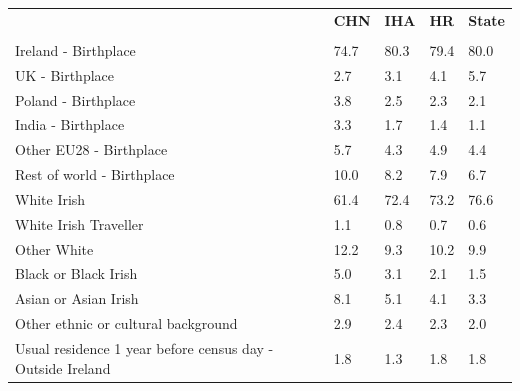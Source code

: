 \documentclass{article}
\begin{document}
\pagebreak
\begin{table}[h]	
\centering
		\begin{tabular}{KTTTT}
  \hline
& \textbf{CHN} & \textbf{IHA} & \textbf{HR}& \textbf{State}\\ 
  \hline
    \\ 
    \hline
Ireland - Birthplace & 74.7& 80.3& 79.4& 80.0\\
UK - Birthplace & 2.7& 3.1& 4.1& 5.7\\
Poland - Birthplace & 3.8& 2.5& 2.3& 2.1\\
India - Birthplace & 3.3& 1.7& 1.4& 1.1\\
Other EU28 - Birthplace & 5.7& 4.3& 4.9& 4.4\\
Rest of world - Birthplace & 10.0&  8.2&  7.9&  6.7\\
    \hline
White Irish & 61.4& 72.4& 73.2& 76.6\\
White Irish Traveller & 1.1& 0.8& 0.7& 0.6\\
Other White & 12.2&  9.3& 10.2&  9.9\\
Black or Black Irish & 5.0& 3.1& 2.1& 1.5\\
Asian or Asian Irish & 8.1& 5.1& 4.1& 3.3\\
Other ethnic or cultural background & 2.9& 2.4& 2.3& 2.0\\
    \hline
Usual residence 1 year before census day - Outside Ireland & 1.8& 1.3& 1.8& 1.8\\


\end{tabular}
\end{table}
\end{document}
